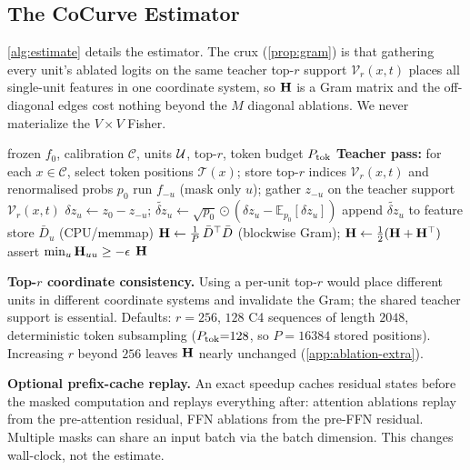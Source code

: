 \subsection{The CoCurve Estimator}

\label{app:estimation}

\cref{alg:estimate} details the estimator. The crux (\cref{prop:gram}) is that gathering every unit's
ablated logits on the same teacher top-$r$ support $\mathcal{V}_r(x,t)$ places all single-unit
features in one coordinate system, so $\mathbf{H}$ is a Gram matrix and the off-diagonal edges cost nothing
beyond the $M$ diagonal ablations. We never materialize the $V\times V$ Fisher.

\begin{algorithm}[t]
\caption{\methodfull\ matrix estimation (single-unit, top-$r$ Fisher Gram)}
\label{alg:estimate}
\begin{algorithmic}[1]
\REQUIRE frozen $f_0$, calibration $\mathcal{C}$, units $\mathcal{U}$, top-$r$, token budget $P_{\rm tok}$
\STATE \textbf{Teacher pass:} for each $x\in\mathcal{C}$, select token positions $\mathcal{T}(x)$; store
  top-$r$ indices $\mathcal{V}_r(x,t)$ and renormalised probs $p_0$
 
  \STATE run $f_{-u}$ (mask only $u$); gather $z_{-u}$ on the teacher support $\mathcal{V}_r(x,t)$
  \STATE $\delta z_u\leftarrow z_0-z_{-u}$;\quad
         $\widetilde{\delta z}_u\leftarrow \sqrt{p_0}\odot(\delta z_u-\mathbb{E}_{p_0}[\delta z_u])$
  \STATE append $\widetilde{\delta z}_u$ to feature store $\bar D_u$ (CPU/memmap)
\ENDFOR
\STATE $\mathbf{H}\leftarrow \tfrac1P\,\bar D^\top\bar D$ (blockwise Gram); $\mathbf{H}\leftarrow\tfrac12(\mathbf{H}+\mathbf{H}^\top)$
\STATE assert $\min_u\mathbf{H}_{uu}\ge -\epsilon$ 
\RETURN $\mathbf{H}$
\end{algorithmic}
\end{algorithm}

\textbf{Top-$r$ coordinate consistency.} Using a per-unit top-$r$ would place different units in
different coordinate systems and invalidate the Gram; the shared teacher support is essential.
Defaults: $r{=}256$, $128$ C4 sequences of length $2048$, deterministic token subsampling
($P_{\rm tok}{=}128$, so $P=16384$ stored positions). Increasing $r$ beyond $256$ leaves $\mathbf{H}$ nearly unchanged (\cref{app:ablation-extra}).

\textbf{Optional prefix-cache replay.} An exact speedup caches residual states before the masked
computation and replays everything after: attention ablations replay from the pre-attention residual,
FFN ablations from the pre-FFN residual. Multiple masks can share an input batch via the batch
dimension. This changes wall-clock, not the estimate.
